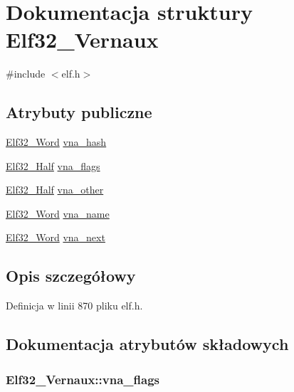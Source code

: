\hypertarget{struct_elf32___vernaux}{\section{Dokumentacja struktury Elf32\-\_\-\-Vernaux}
\label{struct_elf32___vernaux}
}


{\ttfamily \#include $<$elf.\-h$>$}

\subsection*{Atrybuty publiczne}
\begin{DoxyCompactItemize}
\item 
\hyperlink{elf_8h_af5924ece606c732e86f8263a19408e45}{Elf32\-\_\-\-Word} \hyperlink{struct_elf32___vernaux_aeae097b35e2038c53eabb3fe3e0c7bf1}{vna\-\_\-hash}
\item 
\hyperlink{elf_8h_a2ff0787d7d1bae0f251192806a2974ca}{Elf32\-\_\-\-Half} \hyperlink{struct_elf32___vernaux_a4da8f50d1625f6cf7a0c3415e94958fb}{vna\-\_\-flags}
\item 
\hyperlink{elf_8h_a2ff0787d7d1bae0f251192806a2974ca}{Elf32\-\_\-\-Half} \hyperlink{struct_elf32___vernaux_a28f6da095d6169a589ab3bad837258fc}{vna\-\_\-other}
\item 
\hyperlink{elf_8h_af5924ece606c732e86f8263a19408e45}{Elf32\-\_\-\-Word} \hyperlink{struct_elf32___vernaux_a8bf6007fe319d74753d03d0fa7977002}{vna\-\_\-name}
\item 
\hyperlink{elf_8h_af5924ece606c732e86f8263a19408e45}{Elf32\-\_\-\-Word} \hyperlink{struct_elf32___vernaux_acff2104085a8a54ccbb16b0f00be5375}{vna\-\_\-next}
\end{DoxyCompactItemize}


\subsection{Opis szczegółowy}


Definicja w linii 870 pliku elf.\-h.



\subsection{Dokumentacja atrybutów składowych}
\hypertarget{struct_elf32___vernaux_a4da8f50d1625f6cf7a0c3415e94958fb}{
\subsubsection[{vna\-\_\-flags}]{ Elf32\-\_\-\-Vernaux\-::vna\-\_\-flags}}\label{struct_elf32___vernaux_a4da8f50d1625f6cf7a0c3415e94958fb}


